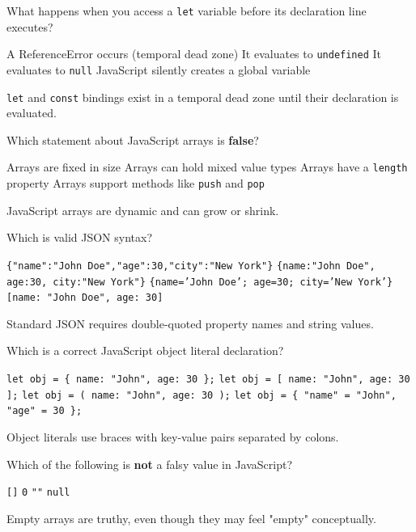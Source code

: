 \question[4]
What happens when you access a \texttt{let} variable before its declaration line executes?
\begin{choices}
  \CorrectChoice A ReferenceError occurs (temporal dead zone)
  \choice It evaluates to \texttt{undefined}
  \choice It evaluates to \texttt{null}
  \choice JavaScript silently creates a global variable
\end{choices}
\begin{solution}
  \texttt{let} and \texttt{const} bindings exist in a temporal dead zone until their declaration is evaluated.
\end{solution}

\question[4]
Which statement about JavaScript arrays is \textbf{false}?
\begin{choices}
  \CorrectChoice Arrays are fixed in size
  \choice Arrays can hold mixed value types
  \choice Arrays have a \texttt{length} property
  \choice Arrays support methods like \texttt{push} and \texttt{pop}
\end{choices}
\begin{solution}
  JavaScript arrays are dynamic and can grow or shrink.
\end{solution}

\question[4]
Which is valid JSON syntax?
\begin{choices}
  \CorrectChoice \texttt{\{"name":"John Doe","age":30,"city":"New York"\}}
  \choice \texttt{\{name:"John Doe", age:30, city:"New York"\}}
  \choice \texttt{\{name='John Doe'; age=30; city='New York'\}}
  \choice \texttt{[name: "John Doe", age: 30]}
\end{choices}
\begin{solution}
  Standard JSON requires double-quoted property names and string values.
\end{solution}

\question[4]
Which is a correct JavaScript object literal declaration?
\begin{choices}
  \CorrectChoice \texttt{let obj = \{ name: "John", age: 30 \};}
  \choice \texttt{let obj = [ name: "John", age: 30 ];}
  \choice \texttt{let obj = ( name: "John", age: 30 );}
  \choice \texttt{let obj = \{ "name" = "John", "age" = 30 \};}
\end{choices}
\begin{solution}
  Object literals use braces with key-value pairs separated by colons.
\end{solution}

\question[4]
Which of the following is \textbf{not} a falsy value in JavaScript?
\begin{choices}
  \CorrectChoice \texttt{[]}
  \choice \texttt{0}
  \choice \texttt{""}
  \choice \texttt{null}
\end{choices}
\begin{solution}
  Empty arrays are truthy, even though they may feel "empty" conceptually.
\end{solution}


